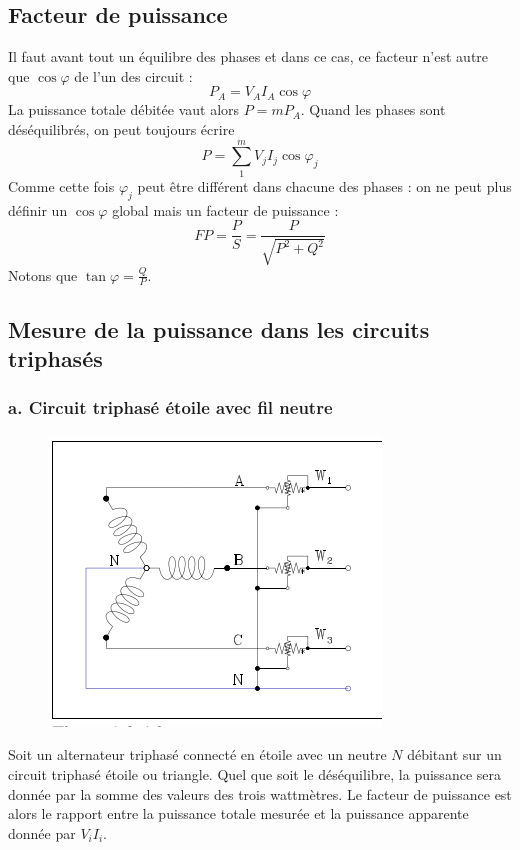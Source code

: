 \subsection{Facteur de puissance}
Il faut avant tout un équilibre des phases et dans ce cas, ce facteur n'est 
autre que $\cos\varphi$ de l'un des circuit : 
\begin{equation}
	P_A = V_AI_A\cos\varphi
\end{equation}
La puissance totale débitée vaut alors $P = mP_A$. Quand les phases sont 
déséquilibrés, on peut toujours écrire
\begin{equation}
	P = \sum_1^m V_jI_j\cos\varphi_j
\end{equation}
Comme cette fois $\varphi_j$ peut être différent dans chacune des phases : on ne peut 
plus définir un $\cos\varphi$ global mais un facteur de puissance :
\begin{equation}
	FP = \frac{P}{S} = \frac{P}{\sqrt{P^2+Q^2}}
\end{equation}
Notons que $\tan\varphi = \frac{Q}{P}$.
	
\subsection{Mesure de la puissance dans les circuits triphasés}
\subsubsection{a. Circuit triphasé étoile avec fil neutre}
\begin{figure}
	\vspace{-5mm}
	\includegraphics[scale=0.35]{ch1/image12.png}
\end{figure}

Soit un alternateur triphasé connecté en étoile avec un neutre $N$ 
débitant sur un circuit triphasé étoile ou triangle. Quel que soit 
le déséquilibre, la puissance sera donnée par la somme des valeurs 
des trois wattmètres. Le facteur de puissance est alors le rapport 
entre la puissance totale mesurée et la puissance apparente donnée 
par $V_iI_i$.\\
\\	
